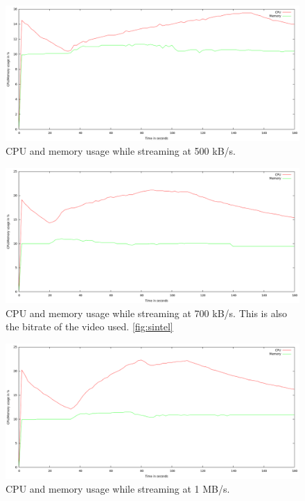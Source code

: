 \begin{center}
\begin{figure}[h]
	\centering
	\mbox{\includegraphics[width=1.2\textwidth]{Images/500kbs.png}}
	\caption{CPU and memory usage while streaming at 500 kB/s.}
	\label{graph:500kbs}
\end{figure}
\end{center}

\begin{center}
\begin{figure}[h]
	\centering
	\mbox{\includegraphics[width=1.2\textwidth]{Images/700kbs.png}}
	\caption{CPU and memory usage while streaming at 700 kB/s. This is also the bitrate of the video used. \ref{fig:sintel}}
	\label{graph:700kbs}
\end{figure}
\end{center}

\begin{center}
\begin{figure}[h]
	\centering
	\mbox{\includegraphics[width=1.2\textwidth]{Images/1000kbs.png}}
	\caption{CPU and memory usage while streaming at 1 MB/s.}
	\label{graph:1Mbs}
\end{figure}
\end{center}
\clearpage

